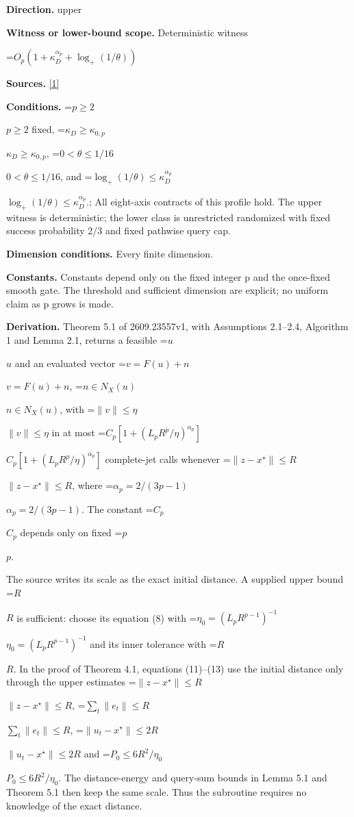 \documentclass[10pt,a4paper]{article}
\newcommand{\AtlasMath}[1]{\par\begingroup\centering\setbox0=\hbox{$\displaystyle #1$}\ifdim\wd0>1.4\linewidth\typeout{ATLAS WIDE FORMULA: \the\wd0}\fi\ifdim\wd0>\linewidth\resizebox{\linewidth}{!}{\box0}\else\box0\fi\par\endgroup}
\newcommand{\AtlasInlineMath}[1]{\begingroup\setbox0=\hbox{$#1$}\ifdim\wd0>.4\linewidth\endgroup\AtlasMath{#1}\else\endgroup$#1$\fi}
\begin{document}
\textbf{Direction.} upper



\textbf{Witness or lower-bound scope.} Deterministic witness



\AtlasMath{O_p\!\left(1+\kappa_D^{\alpha_p}+\log_+(1/\theta)\right)}


\textbf{Sources.} \href{https://arxiv.org/pdf/2609.23557v1}{[1]}



\textbf{Conditions.} \AtlasInlineMath{p\ge2} fixed, \AtlasInlineMath{\kappa_D\ge\kappa_{0,p}}, \AtlasInlineMath{0<\theta\le1/16}, and \AtlasInlineMath{\log_+(1/\theta)\le\kappa_D^{\alpha_p}}.; All eight-axis contracts of this profile hold. The upper witness is deterministic; the lower class is unrestricted randomized with fixed success probability 2/3 and fixed pathwise query cap.



\textbf{Dimension conditions.} Every finite dimension.



\textbf{Constants.} Constants depend only on the fixed integer p and the once-fixed smooth gate. The threshold and sufficient dimension are explicit; no uniform claim as p grows is made.



\textbf{Derivation.} Theorem 5.1 of 2609.23557v1, with Assumptions 2.1--2.4, Algorithm 1 and Lemma 2.1, returns a feasible \AtlasInlineMath{u} and an evaluated vector \AtlasInlineMath{v=F(u)+n}, \AtlasInlineMath{n\in N_X(u)}, with \AtlasInlineMath{\|v\|\le\eta} in at most \AtlasInlineMath{C_p[1+(L_pR^p/\eta)^{\alpha_p}]} complete-jet calls whenever \AtlasInlineMath{\|z-x^\star\|\le R}, where \AtlasInlineMath{\alpha_p=2/(3p-1)}. The constant \AtlasInlineMath{C_p} depends only on fixed \AtlasInlineMath{p}.

The source writes its scale as the exact initial distance. A supplied upper bound \AtlasInlineMath{R} is sufficient: choose its equation (8) with \AtlasInlineMath{\eta_0=(L_pR^{p-1})^{-1}} and its inner tolerance with \AtlasInlineMath{R}. In the proof of Theorem 4.1, equations (11)--(13) use the initial distance only through the upper estimates \AtlasInlineMath{\|z-x^\star\|\le R}, \AtlasInlineMath{\sum_t\|e_t\|\le R}, \AtlasInlineMath{\|u_t-x^\star\|\le2R} and \AtlasInlineMath{P_0\le6R^2/\eta_0}. The distance-energy and query-sum bounds in Lemma 5.1 and Theorem 5.1 then keep the same scale. Thus the subroutine requires no knowledge of the exact distance.
\end{document}
